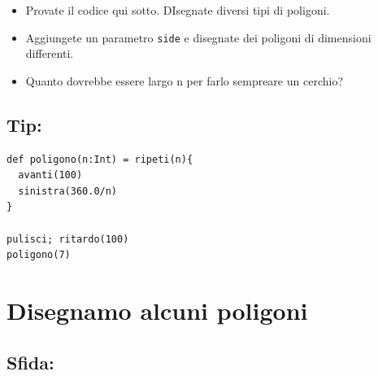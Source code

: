 \begin{itemize}

\item {Provate il codice qui sotto. DIsegnate diversi tipi di poligoni.}
\item {Aggiungete un parametro \lstinline{side} e disegnate dei poligoni di dimensioni differenti.}
\item {Quanto dovrebbe essere largo n per farlo sempreare un cerchio?}

\end{itemize}


\section*{\color{OliveGreen}Tip:}

\begin{lstlisting}[basicstyle={\ttfamily\fontsize{18}{22}\selectfont},numbers=none]
def poligono(n:Int) = ripeti(n){
  avanti(100)
  sinistra(360.0/n)
}

pulisci; ritardo(100)
poligono(7)
\end{lstlisting}
        

  
\chapter{Disegnamo alcuni poligoni}\section*{\color{BrickRed}Sfida:}


